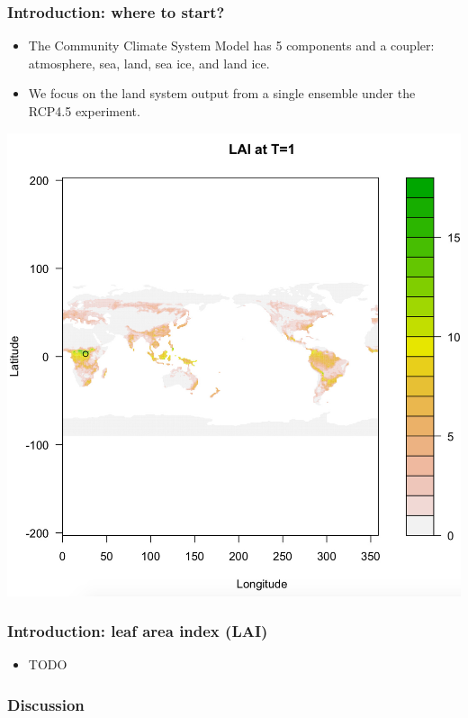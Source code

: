 \documentclass{beamer}
\begin{document}
\begin{frame}
    \frametitle{Introduction: where to start?}
    \begin{itemize}
        \item The Community Climate System Model has 5 components and a coupler:
            atmosphere, sea, land, sea ice, and land ice.
        \item We focus on the land system output from a single ensemble under
            the RCP4.5 experiment.
    \end{itemize}
    \includegraphics[width=\textwidth]{../img/LAI global t0.jpg}
\end{frame}

\begin{frame}
    \frametitle{Introduction: leaf area index (LAI)}
    \begin{itemize}
        \item TODO
    \end{itemize}
\end{frame}


\begin{frame}
    \frametitle{Discussion}
\end{frame}
\end{document}
